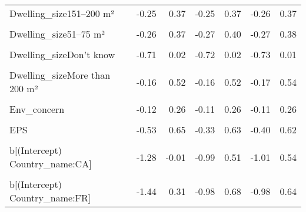 \begin{table}
\begin{tabular}[t]{lrrrrrr}
Dwelling\_size151–200 m² & -0.25 & 0.37 & -0.25 & 0.37 & -0.26 & 0.37\\
\cellcolor{gray!10}{Dwelling\_size26–50 m²} & \cellcolor{gray!10}{-0.51} & \cellcolor{gray!10}{0.40} & \cellcolor{gray!10}{-0.55} & \cellcolor{gray!10}{0.42} & \cellcolor{gray!10}{-0.52} & \cellcolor{gray!10}{0.38}\\
Dwelling\_size51–75 m² & -0.26 & 0.37 & -0.27 & 0.40 & -0.27 & 0.38\\
\cellcolor{gray!10}{Dwelling\_size76–100 m²} & \cellcolor{gray!10}{-0.29} & \cellcolor{gray!10}{0.27} & \cellcolor{gray!10}{-0.28} & \cellcolor{gray!10}{0.28} & \cellcolor{gray!10}{-0.30} & \cellcolor{gray!10}{0.28}\\
Dwelling\_sizeDon't know & -0.71 & 0.02 & -0.72 & 0.02 & -0.73 & 0.01\\
\cellcolor{gray!10}{Dwelling\_sizeLess than 25 m²} & \cellcolor{gray!10}{-0.41} & \cellcolor{gray!10}{0.95} & \cellcolor{gray!10}{-0.41} & \cellcolor{gray!10}{0.95} & \cellcolor{gray!10}{-0.44} & \cellcolor{gray!10}{0.97}\\
Dwelling\_sizeMore than 200 m² & -0.16 & 0.52 & -0.16 & 0.52 & -0.17 & 0.54\\
\cellcolor{gray!10}{Rural} & \cellcolor{gray!10}{0.00} & \cellcolor{gray!10}{0.40} & \cellcolor{gray!10}{-0.01} & \cellcolor{gray!10}{0.41} & \cellcolor{gray!10}{-0.01} & \cellcolor{gray!10}{0.39}\\
Env\_concern & -0.12 & 0.26 & -0.11 & 0.26 & -0.11 & 0.26\\
\cellcolor{gray!10}{Gov\_support} & \cellcolor{gray!10}{8.34} & \cellcolor{gray!10}{19.84} & \cellcolor{gray!10}{8.31} & \cellcolor{gray!10}{20.88} & \cellcolor{gray!10}{8.41} & \cellcolor{gray!10}{20.63}\\
EPS & -0.53 & 0.65 & -0.33 & 0.63 & -0.40 & 0.62\\
\cellcolor{gray!10}{b[(Intercept) Country\_name:BE]} & \cellcolor{gray!10}{0.09} & \cellcolor{gray!10}{1.25} & \cellcolor{gray!10}{-0.52} & \cellcolor{gray!10}{1.03} & \cellcolor{gray!10}{-0.52} & \cellcolor{gray!10}{0.98}\\
b[(Intercept) Country\_name:CA] & -1.28 & -0.01 & -0.99 & 0.51 & -1.01 & 0.54\\
\cellcolor{gray!10}{b[(Intercept) Country\_name:CH]} & \cellcolor{gray!10}{-0.72} & \cellcolor{gray!10}{0.82} & \cellcolor{gray!10}{-0.69} & \cellcolor{gray!10}{0.73} & \cellcolor{gray!10}{-0.75} & \cellcolor{gray!10}{0.79}\\
b[(Intercept) Country\_name:FR] & -1.44 & 0.31 & -0.98 & 0.68 & -0.98 & 0.64\\

\end{tabular}
\end{table}
